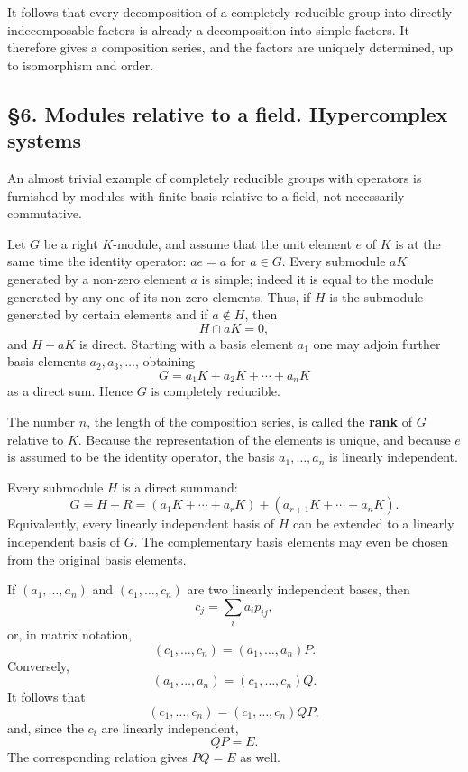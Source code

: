 \documentclass[11pt]{article}
\begin{document}
It follows that every decomposition of a completely reducible group into
directly indecomposable factors is already a decomposition into simple
factors. It therefore gives a composition series, and the factors are
uniquely determined, up to isomorphism and order.

\subsection{§6. Modules relative to a field. Hypercomplex
systems}\label{modules-relative-to-a-field.-hypercomplex-systems}

An almost trivial example of completely reducible groups with operators
is furnished by modules with finite basis relative to a field, not
necessarily commutative.

Let \(G\) be a right \(K\)-module, and assume that the unit element
\(e\) of \(K\) is at the same time the identity operator: \(ae=a\) for
\(a\in G\). Every submodule \(aK\) generated by a non-zero element \(a\)
is simple; indeed it is equal to the module generated by any one of its
non-zero elements. Thus, if \(H\) is the submodule generated by certain
elements and if \(a\notin H\), then \[
  H\cap aK=0,
\] and \(H+aK\) is direct. Starting with a basis element \(a_1\) one may
adjoin further basis elements \(a_2,a_3,\ldots\), obtaining \[
  G=a_1K+a_2K+\cdots+a_nK
\] as a direct sum. Hence \(G\) is completely reducible.

The number \(n\), the length of the composition series, is called the
\textbf{rank} of \(G\) relative to \(K\). Because the representation of
the elements is unique, and because \(e\) is assumed to be the identity
operator, the basis \(a_1,\ldots,a_n\) is linearly independent.

Every submodule \(H\) is a direct summand: \[
  G=H+R=(a_1K+\cdots+a_rK)+(a_{r+1}K+\cdots+a_nK).
\] Equivalently, every linearly independent basis of \(H\) can be
extended to a linearly independent basis of \(G\). The complementary
basis elements may even be chosen from the original basis elements.

If \((a_1,\ldots,a_n)\) and \((c_1,\ldots,c_n)\) are two linearly
independent bases, then \[
  c_j=\sum_i a_i p_{ij},
\] or, in matrix notation, \[
  (c_1,\ldots,c_n)=(a_1,\ldots,a_n)P.
\] Conversely, \[
  (a_1,\ldots,a_n)=(c_1,\ldots,c_n)Q.
\] It follows that \[
  (c_1,\ldots,c_n)=(c_1,\ldots,c_n)QP,
\] and, since the \(c_i\) are linearly independent, \[
  QP=E.
\] The corresponding relation gives \(PQ=E\) as well.
\end{document}
